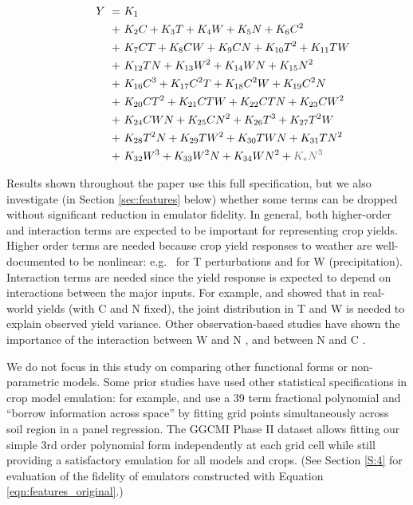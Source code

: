 \documentclass[gmdd]{copernicus} %
\begin{document}
\vspace{-0.3in}
\begin{align}
    \hspace{10mm}  \label{eqn:features_original}
        Y\ = \ & K_{1} \\
        + \ & K_{2} C      + K_{3} T      + K_{4} W      + K_{5} N    + K_{6} C^2       \nonumber \\
        + \ & K_{7} C T    + K_{8} C W    + K_{9} C N    + K_{10} T^2 + K_{11} T W      \nonumber \\
        + \ & K_{12} T N   + K_{13} W^2   + K_{14} W N   + K_{15} N^2                   \nonumber \\
        + \ & K_{16} C^3   + K_{17} C^2 T + K_{18} C^2 W + K_{19} C^2 N                 \nonumber \\
        + \ & K_{20} C T^2 + K_{21} C T W + K_{22} C T N + K_{23} C W^2                 \nonumber \\
        + \ & K_{24} C W N + K_{25} C N^2 + K_{26} T^3   + K_{27} T^2 W                 \nonumber \\
        + \ & K_{28} T^2 N + K_{29} T W^2 + K_{30} T W N + K_{31} T N^2                 \nonumber \\
        + \ & K_{32} W^3   + K_{33} W^2 N + K_{34} W N^2 + {\color{dark-gray}K_{*} N^3} \nonumber
\end{align}

Results shown throughout the paper use this full specification, but we also investigate (in Section \ref{sec:features} below) whether some terms can be dropped without significant reduction in emulator fidelity.
In general, both higher-order and interaction terms are expected to be important for representing crop yields. Higher order terms are needed because crop yield responses to weather are well-documented to be nonlinear: e.g.\ \citet{Schlenker2009} for T perturbations and \citet{He2016} for W (precipitation). 
Interaction terms are needed since the yield response is expected to depend on interactions between the major inputs. 
For example, \citet{Lobell2007} and \citet{Tebaldi2008} showed that in real-world yields (with C and N fixed), the joint distribution in T and W is needed to explain observed yield variance.  
Other observation-based studies have shown the importance of the interaction between W and N \citep[e.g.][]{AULAKH2005}, and between N and C \citep{Mitsuru92, Nakamura97}.

We do not focus in this study on comparing other functional forms or non-parametric models.
Some prior studies have used other statistical specifications in crop model emulation: for example, \citet{BLANC2015} and \citet{BLANC2017} use a 39 term fractional polynomial and ``borrow information across space'' by fitting grid points simultaneously across soil region in a panel regression. 
The GGCMI Phase II dataset allows fitting our simple 3rd order polynomial form independently at each grid cell while still providing a satisfactory emulation for all models and crops. 
(See Section \ref{S:4} for evaluation of the fidelity of emulators constructed with Equation \ref{eqn:features_original}.)
\end{document}
